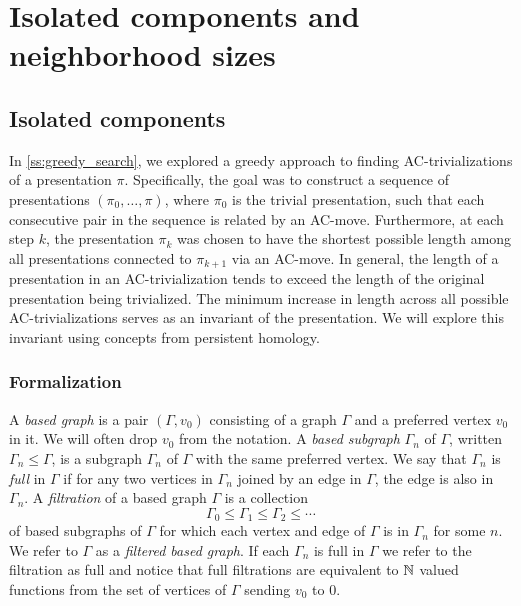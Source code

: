 
\section{Isolated components and neighborhood sizes}\label{sec:isolated}

\subsection{Isolated components}

In \autoref{ss:greedy_search}, we explored a greedy approach to finding AC-trivializations of a presentation \(\pi\).
Specifically, the goal was to construct a sequence of presentations \((\pi_0, \dots, \pi)\), where \(\pi_0\) is the trivial presentation, such that each consecutive pair in the sequence is related by an AC-move.
Furthermore, at each step \(k\), the presentation \(\pi_k\) was chosen to have the shortest possible length among all presentations connected to \(\pi_{k+1}\) via an AC-move.
In general, the length of a presentation in an AC-trivialization tends to exceed the length of the original presentation being trivialized.
The minimum increase in length across all possible AC-trivializations serves as an invariant of the presentation.
We will explore this invariant using concepts from persistent homology.

\subsubsection{Formalization}

A \textit{based graph} is a pair $(\Gamma, v_0)$ consisting of a graph $\Gamma$ and a preferred vertex $v_0$ in it.
We will often drop $v_0$ from the notation.
A \textit{based subgraph} $\Gamma_n$ of $\Gamma$, written $\Gamma_n \leq \Gamma$, is a subgraph $\Gamma_n$ of $\Gamma$ with the same preferred vertex.
We say that $\Gamma_n$ is \textit{full} in $\Gamma$ if for any two vertices in $\Gamma_n$ joined by an edge in $\Gamma$, the edge is also in $\Gamma_n$.
A \textit{filtration} of a based graph $\Gamma$ is a collection
\[
\Gamma_0 \leq \Gamma_1 \leq \Gamma_2 \leq \dotsb
\]
of based subgraphs of $\Gamma$ for which each vertex and edge of $\Gamma$ is in $\Gamma_n$ for some $n$.
We refer to $\Gamma$ as a \textit{filtered based graph}.
If each $\Gamma_n$ is full in $\Gamma$ we refer to the filtration as full and notice that full filtrations are equivalent to $\mathbb{N}$ valued functions from the set of vertices of $\Gamma$ sending $v_0$ to $0$.

